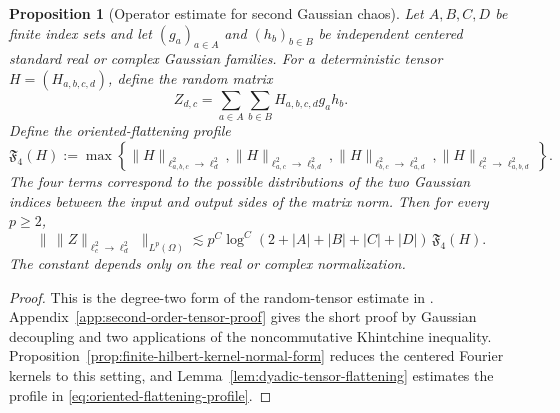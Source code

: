 \documentclass[10pt]{amsart}
\numberwithin{equation}{section}
\theoremstyle{plain}
\newtheorem{proposition}[theorem]{Proposition}
\theoremstyle{definition}
\theoremstyle{remark}
\begin{document}
\begin{proposition}[Operator estimate for second Gaussian chaos]\label{prop:abstract-random-tensor}
Let $A,B,C,D$ be finite index sets and let $(g_a)_{a\in A}$ and $(h_b)_{b\in B}$ be independent centered standard real or complex Gaussian families.  For a deterministic tensor $H=(H_{a,b,c,d})$, define the random matrix
\[
        Z_{d,c}=\sum_{a\in A}\sum_{b\in B}H_{a,b,c,d}g_ah_b.
\]
Define the oriented-flattening profile
\begin{equation}\label{eq:oriented-flattening-profile}
\mathfrak F_4(H):=\max\left\{
\|H\|_{\ell^2_{a,b,c}\to\ell^2_d},
\|H\|_{\ell^2_{a,c}\to\ell^2_{b,d}},
\|H\|_{\ell^2_{b,c}\to\ell^2_{a,d}},
\|H\|_{\ell^2_c\to\ell^2_{a,b,d}}
\right\}.
\end{equation}
The four terms correspond to the possible distributions of the two Gaussian indices between the input and output sides of the matrix norm.  Then for every $p\ge2$,
\begin{equation}\label{eq:abstract-random-tensor}
 \bigl\|\,\|Z\|_{\ell^2_c\to\ell^2_d}\,\bigr\|_{L^p(\Omega)}
 \lesssim p^C\log^C(2+|A|+|B|+|C|+|D|)\,\mathfrak F_4(H).
\end{equation}
The constant depends only on the real or complex normalization.
\end{proposition}

\begin{proof}
This is the degree-two form of the random-tensor estimate in \cite{DNY,Kaneshiro}.  Appendix~\ref{app:second-order-tensor-proof} gives the short proof by Gaussian decoupling and two applications of the noncommutative Khintchine inequality.  Proposition~\ref{prop:finite-hilbert-kernel-normal-form} reduces the centered Fourier kernels to this setting, and Lemma~\ref{lem:dyadic-tensor-flattening} estimates the profile in \eqref{eq:oriented-flattening-profile}.
\end{proof}
\end{document}
